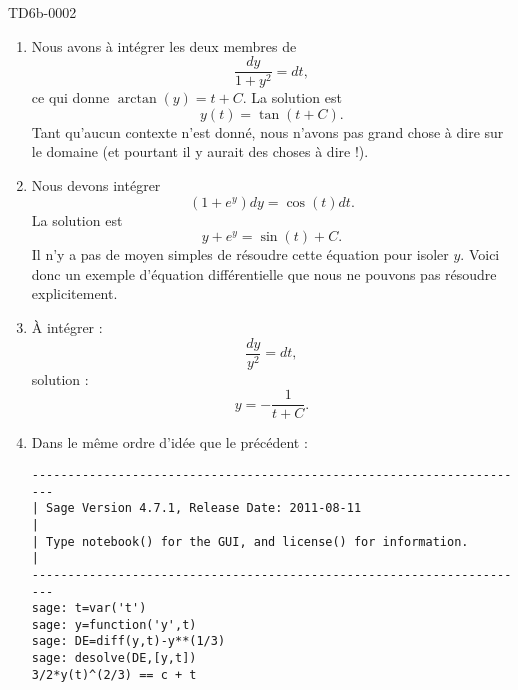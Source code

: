 \begin{corrige}{TD6b-0002}
\begin{enumerate}
        \item

            Nous avons à intégrer les deux membres de
            \begin{equation}
                \frac{ dy }{ 1+y^2 }=dt,
            \end{equation}
            ce qui donne \( \arctan(y)=t+C\). La solution est
            \begin{equation}
                y(t)=\tan(t+C).
            \end{equation}
            Tant qu'aucun contexte n'est donné, nous n'avons pas grand chose à dire sur le domaine (et pourtant il y aurait des choses à dire !).

        \item

            Nous devons intégrer
            \begin{equation}
                (1+e^y)dy=\cos(t)dt.
            \end{equation}
            La solution est
            \begin{equation}
                y+e^y=\sin(t)+C.
            \end{equation}
            Il n'y a pas de moyen simples de résoudre cette équation pour isoler \( y\). Voici donc un exemple d'équation différentielle que nous ne pouvons pas résoudre explicitement.

        \item

            À intégrer : 
            \begin{equation}
                \frac{ dy }{ y^2 }=dt,
            \end{equation}
            solution :
            \begin{equation}
                y=-\frac{1}{ t+C }.
            \end{equation}
            
        \item

            Dans le même ordre d'idée que le précédent :
            \begin{verbatim}
----------------------------------------------------------------------
| Sage Version 4.7.1, Release Date: 2011-08-11                       |
| Type notebook() for the GUI, and license() for information.        |
----------------------------------------------------------------------
sage: t=var('t')
sage: y=function('y',t)
sage: DE=diff(y,t)-y**(1/3)
sage: desolve(DE,[y,t])
3/2*y(t)^(2/3) == c + t
            \end{verbatim}
            

\end{enumerate}
\end{corrige}

